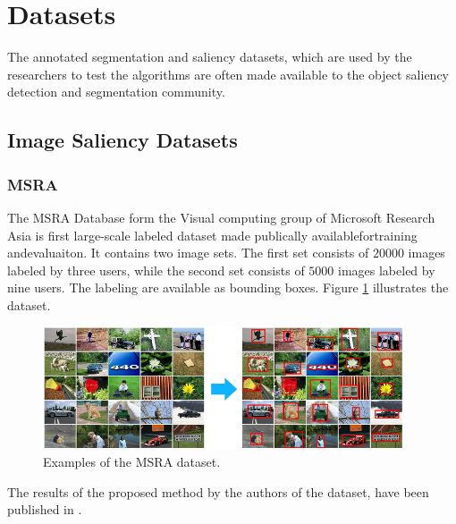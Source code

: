 \section{Datasets}
\label{sec:db}

The annotated segmentation and saliency datasets, which are used by the researchers to test the algorithms are often made available to the object saliency detection and segmentation community.

\subsection{Image Saliency Datasets}
\subsubsection{MSRA}\label{subsec:msra}
The MSRA  Database form the Visual computing group of Microsoft Research Asia \cite{msra_db} is  first large-scale labeled dataset made publically availablefortraining andevaluaiton. It contains two image sets. The first set consists of $20 000$ images labeled by three users, while the second set consists of $5000$ images labeled by nine users. The labeling are available as bounding boxes. Figure \ref{fig:msra} illustrates the dataset.
\begin{figure}[H]
\begin{center}
\includegraphics[width=0.95\textwidth]{fig/MSRA}
\end{center}
\caption{Examples of the MSRA dataset.}
\label{fig:msra}
\end{figure}

The results of the proposed method by the authors of the dataset, have been published in \cite{LiuCVPR2007}.

